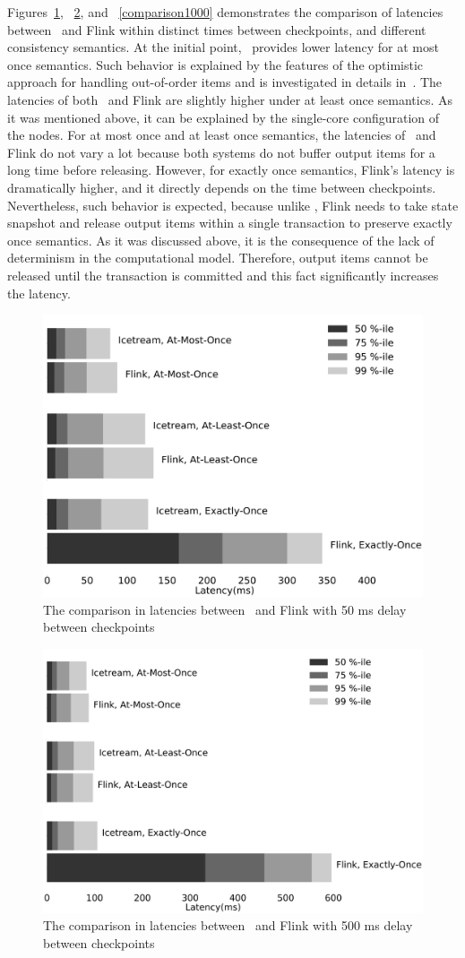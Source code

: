 Figures~\ref{comparison50}, ~\ref{comparison500}, and ~\ref{comparison1000} demonstrates the comparison of latencies between \FlameStream\ and Flink within distinct times between checkpoints, and different consistency semantics. At the initial point, \FlameStream\ provides lower latency for at most once semantics. Such behavior is explained by the features of the optimistic approach for handling out-of-order items and is investigated in details in~\cite{hiddenSeim}. The latencies of both \FlameStream\ and Flink are slightly higher under at least once semantics. As it was mentioned above, it can be explained by the single-core configuration of the nodes. For at most once and at least once semantics, the latencies of \FlameStream\ and Flink do not vary a lot because both systems do not buffer output items for a long time before releasing. However, for exactly once semantics, Flink's latency is dramatically higher, and it directly depends on the time between checkpoints. Nevertheless, such behavior is expected, because unlike \FlameStream, Flink needs to take state snapshot and release output items within a single transaction to preserve exactly once semantics. As it was discussed above, it is the consequence of the lack of determinism in the computational model. Therefore, output items cannot be released until the transaction is committed and this fact significantly increases the latency. 

\begin{figure}[htbp]
  \centering
  \includegraphics[width=.5\textwidth]{pics/comparison50}
  \caption{The comparison in latencies between \FlameStream\ and Flink with 50 ms delay between checkpoints}
  \label {comparison50}
\end{figure}

\begin{figure}[htbp]
  \centering
  \includegraphics[width=.5\textwidth]{pics/comparison500}
  \caption{The comparison in latencies between \FlameStream\ and Flink with 500 ms delay between checkpoints}
  \label {comparison500}
\end{figure}

